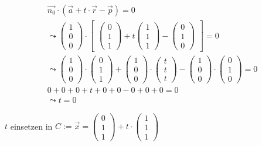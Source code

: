 \begin{gather}
\vec{n_0} \cdot (\vec{a}+t\cdot \vec{r}-\vec{p})=0\\
\leadsto 
\begin{pmatrix}
1\\0\\0
\end{pmatrix} \cdot 
\begin{bmatrix}
\begin{pmatrix}
0\\1\\1
\end{pmatrix}
+ t
\begin{pmatrix}
1\\1\\1
\end{pmatrix}
-
\begin{pmatrix}
0\\1\\0
\end{pmatrix}
\end{bmatrix} = 0\\
\leadsto
\begin{pmatrix}
1\\0\\0
\end{pmatrix}\cdot
\begin{pmatrix}
0\\1\\1
\end{pmatrix}
+
\begin{pmatrix}
1\\0\\0
\end{pmatrix}
\cdot
\begin{pmatrix}
t\\t\\t
\end{pmatrix}
-
\begin{pmatrix}
1\\0\\0
\end{pmatrix}
\cdot
\begin{pmatrix}
0\\1\\0
\end{pmatrix} =0\\
0+0+0+t+0+0-0+0+0=0\\
\leadsto t=0
\end{gather}

\ensuremath{t} einsetzen in \ensuremath{C:= \vec{x}=\begin{pmatrix}
		0\\1\\1
	\end{pmatrix} +t\cdot\begin{pmatrix}
		1\\1\\1
\end{pmatrix}}\\

